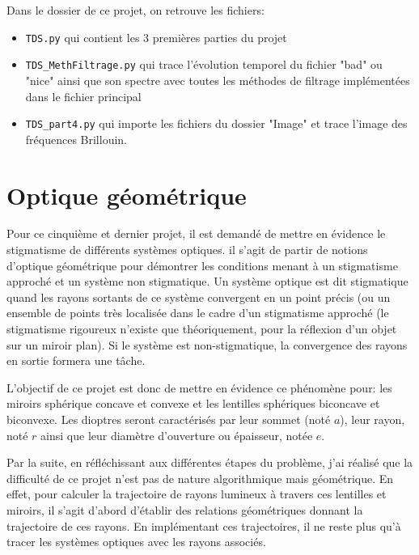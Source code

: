 \documentclass[a4paper, 11pt]{article}
\begin{document}
Dans le dossier de ce projet, on retrouve les fichiers:
\begin{itemize}
	\item \verb|TDS.py| qui contient les 3 premières parties du projet
	\item \verb|TDS_MethFiltrage.py| qui trace l'évolution temporel du fichier "bad" ou "nice" ainsi que son spectre avec toutes les méthodes de filtrage implémentées dans le fichier principal
	\item \verb|TDS_part4.py| qui importe les fichiers du dossier "Image" et trace l'image des fréquences Brillouin.
\end{itemize}





\newpage
\section{Optique géométrique}
Pour ce cinquième et dernier projet, il est demandé de mettre en évidence le stigmatisme de différents systèmes optiques. il s'agit de partir de notions d'optique géométrique pour démontrer les conditions menant à un stigmatisme approché et un système non stigmatique. Un système optique est dit stigmatique quand les rayons sortants de ce système convergent en un point précis (ou un ensemble de points très localisée dans le cadre d'un stigmatisme approché (le stigmatisme rigoureux n'existe que théoriquement, pour la réflexion d'un objet sur un miroir plan). Si le système est non-stigmatique, la convergence des rayons en sortie formera une tâche.

L'objectif de ce projet est donc de mettre en évidence ce phénomène pour: les miroirs sphérique concave et convexe et les lentilles sphériques biconcave et biconvexe. Les dioptres seront caractérisés par leur sommet (noté $a$), leur rayon, noté $r$ ainsi que leur diamètre d'ouverture ou épaisseur, notée $e$.

Par la suite, en réfléchissant aux différentes étapes du problème, j'ai réalisé que la difficulté de ce projet n'est pas de nature algorithmique mais géométrique. En effet, pour calculer la trajectoire de rayons lumineux à travers ces lentilles et miroirs, il s'agit d'abord d'établir des relations géométriques donnant la trajectoire de ces rayons. En implémentant ces trajectoires, il ne reste plus qu'à tracer les systèmes optiques avec les rayons associés.
\end{document}
